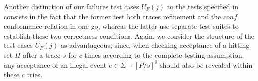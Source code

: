 Another distinction of our failures test cases $U_F(j)$ to the tests
specified in~\cite{DBLP:conf/icfem/CavalcantiG07} consists in the fact that
the former test both traces refinement and the $conf$ conformance relation in
one go, whereas the latter use separate test suites to establish these two
correctness conditions. Again, we consider the structure of the  test cases
$U_F(j)$ as advantageous, since, when checking acceptance of a hitting set
$H$ after a trace $s$ for $c$ times according to the complete testing
assumption, any acceptance of an illegal event $e\in\Sigma - [P/s]^0$ should
also be revealed within these $c$ tries.


%


